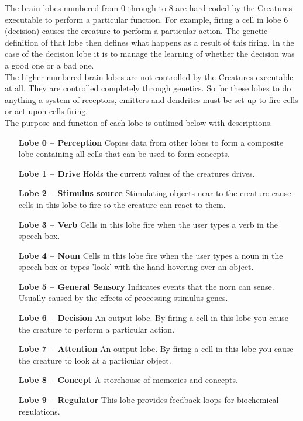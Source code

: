 \documentclass[11pt,twoside,a4paper]{article}
\begin{document}
The brain lobes numbered from 0 through to 8 are hard coded by the Creatures executable to perform a particular function. For example, firing a cell in lobe 6 (decision) causes the creature to perform a particular action. The genetic definition of that lobe then defines what happens as a result of this firing. In the case of the decision lobe it is to manage the learning of whether the decision was a good one or a bad one.~\\

The higher numbered brain lobes are not controlled by the Creatures executable at all. They are controlled completely through genetics. So for these lobes to do anything a system of receptors, emitters and dendrites must be set up to fire cells or act upon cells firing.~\\

The purpose and function of each lobe is outlined below with descriptions.
\begin{itemize}
\item[\textbf{Lobe 0 -- Perception}]
    Copies data from other lobes to form a composite lobe containing all cells that can be used to form concepts.
\item[\textbf{Lobe 1 -- Drive}]
    Holds the current values of the creatures drives.
\item[\textbf{Lobe 2 -- Stimulus source}]
    Stimulating objects near to the creature cause cells in this lobe to fire so the creature can react to them.
\item[\textbf{Lobe 3 -- Verb}]
    Cells in this lobe fire when the user types a verb in the speech box.
\item[\textbf{Lobe 4 -- Noun}]
    Cells in this lobe fire when the user types a noun in the speech box or types 'look' with the hand hovering over an object.
\item[\textbf{Lobe 5 -- General Sensory}]
    Indicates events that the norn can sense. Usually caused by the effects of processing stimulus genes.
\item[\textbf{Lobe 6 -- Decision}]
    An output lobe. By firing a cell in this lobe you cause the creature to perform a particular action.
\item[\textbf{Lobe 7 -- Attention}]
    An output lobe. By firing a cell in this lobe you cause the creature to look at a particular object.
\item[\textbf{Lobe 8 -- Concept}]
    A storehouse of memories and concepts.
\item[\textbf{Lobe 9 -- Regulator}]
    This lobe provides feedback loops for biochemical regulations. %
\end{itemize}~\\
\end{document}
